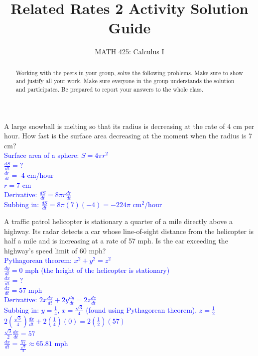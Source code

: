 \documentclass{ximera}
\title{Related Rates 2 Activity Solution Guide}
\author{MATH 425: Calculus I}
\begin{document}
\begin{abstract}
   Working with the peers in your group, solve the following problems. Make sure to show and justify all your work. Make sure everyone in the group understands the solution and participates. Be prepared to report your answers to the whole class. 
\end{abstract}
\maketitle

\begin{exercise}
    A large snowball is melting so that its radius is decreasing at the rate of 4 cm per hour.  How fast is the surface area decreasing at the moment when the radius is 7 cm? \\
    \textcolor{blue}{Surface area of a sphere: $S=4\pi r^2$\\
    $\frac{dS}{dt}=?$\\
    $\frac{dr}{dt}=$-4 cm/hour\\
    $r=7$ cm\\
    Derivative: $\frac{dS}{dt}=8\pi r\frac{dr}{dt}$\\
    Subbing in: $\frac{dS}{dt}=8\pi(7)(-4)=-224\pi$ cm$^2$/hour }
\end{exercise}
    
\begin{exercise}
    A traffic patrol helicopter is stationary a quarter of a mile directly above a highway.  Its radar detects a car whose line-of-sight distance from the helicopter is half a mile and is increasing at a rate of 57 mph.  Is the car exceeding the highway's speed limit of 60 mph?\\
    \textcolor{blue}{Pythagorean theorem: $x^2+y^2=z^2$\\
    $\frac{dy}{dt}=0$ mph (the height of the helicopter is stationary)\\
    $\frac{dx}{dt}=?$ \\
    $\frac{dz}{dt}=57$ mph\\
    Derivative: $2x\frac{dx}{dt}+2y\frac{dy}{dt}=2z\frac{dz}{dt}$\\
    Subbing in: $y=\frac{1}{4}$, $x=\frac{\sqrt{3}}{4}$ (found using Pythagorean theorem), $z=\frac{1}{2}$\\
    $2(\frac{\sqrt{3}}{4})\frac{dx}{dt}+2(\frac{1}{4})(0)=2(\frac{1}{2})(57)$\\
    $\frac{\sqrt{3}}{2}\frac{dx}{dt}=57$\\
    $\frac{dx}{dt}=\frac{57}{\frac{\sqrt{3}}{2}}\approx 65.81$ mph}
\end{exercise}
   
\end{document}

